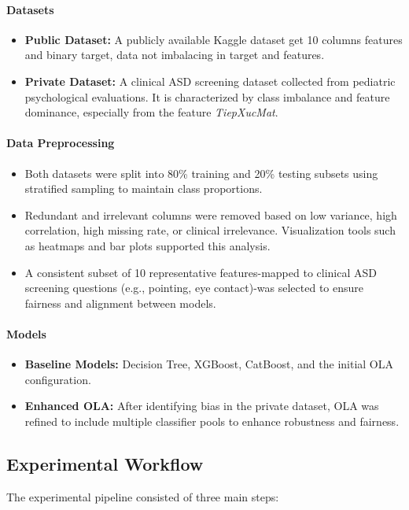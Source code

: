 \documentclass[conference]{IEEEtran}
\begin{document}
\paragraph{\textbf{Datasets}}
\begin{itemize}
\item \textbf{Public Dataset:} A publicly available Kaggle dataset get 10 columns features and binary target, data not imbalacing in target and features. 
\item \textbf{Private Dataset:} A clinical ASD screening dataset collected from pediatric psychological evaluations. It is characterized by class imbalance and feature dominance, especially from the feature \textit{TiepXucMat}.
\end{itemize}

\paragraph{\textbf{Data Preprocessing}}
\begin{itemize}
\item Both datasets were split into 80\% training and 20\% testing subsets using stratified sampling to maintain class proportions.
\item Redundant and irrelevant columns were removed based on low variance, high correlation, high missing rate, or clinical irrelevance. Visualization tools such as heatmaps and bar plots supported this analysis.
\item A consistent subset of 10 representative features-mapped to clinical ASD screening questions (e.g., pointing, eye contact)-was selected to ensure fairness and alignment between models.
\end{itemize}

\paragraph{\textbf{Models}}
\begin{itemize}
\item \textbf{Baseline Models:} Decision Tree, XGBoost, CatBoost, and the initial OLA configuration.
\item \textbf{Enhanced OLA:} After identifying bias in the private dataset, OLA was refined to include multiple classifier pools to enhance robustness and fairness.
\end{itemize}

\subsection{Experimental Workflow}
The experimental pipeline consisted of three main steps:
\end{document}

